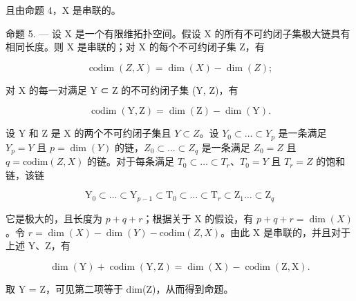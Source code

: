 且由命题 4，X 是串联的。

命题 5. — 设 X 是一个有限维拓扑空间。假设 X 的所有不可约闭子集极大链具有相同长度。则 X 是串联的；对 X 的每个不可约闭子集 Z，有

\[
\operatorname{codim} (Z, X) = \dim (X) - \dim (Z);
\]

对 X 的每一对满足 Y ⊂ Z 的不可约闭子集 (Y, Z)，有

\[
\operatorname{codim} (\mathrm{Y}, \mathrm{Z}) = \dim (\mathrm{Z}) - \dim (\mathrm{Y}).
\]

设 Y 和 Z 是 X 的两个不可约闭子集且 \(Y \subset Z\)。设 \(Y_{0} \subset \ldots \subset Y_{p}\) 是一条满足 \(Y_{p} = Y\) 且 \(p = \dim(Y)\) 的链，\(Z_{0} \subset \ldots \subset Z_{q}\) 是一条满足 \(Z_{0} = Z\) 且 \(q = \text{codim}(Z, X)\) 的链。对于每条满足 \(T_{0} \subset \ldots \subset T_{r}\)、\(T_{0} = Y\) 且 \(T_{r} = Z\) 的饱和链，该链

\[
\mathrm{Y} _ {0} \subset \dots \subset \mathrm{Y} _ {p - 1} \subset \mathrm{T} _ {0} \subset \dots \subset \mathrm{T} _ {r} \subset \mathrm{Z} _ {1} \dots \subset \mathrm{Z} _ {q}
\]

它是极大的，且长度为 \(p + q + r\)；根据关于 X 的假设，有 \(p + q + r = \dim(X)\)。令 \(r = \dim(X) - \dim(Y) - \text{codim}(Z, X)\)。由此 X 是串联的，并且对于上述 Y、Z，有

\[
\dim (\mathrm{Y}) + \operatorname{codim} (\mathrm{Y}, \mathrm{Z}) = \dim (\mathrm{X}) - \operatorname{codim} (\mathrm{Z}, \mathrm{X}).
\]

取 Y = Z，可见第二项等于 dim(Z)，从而得到命题。

